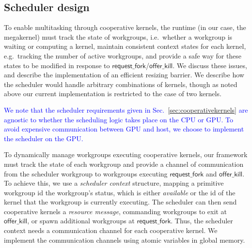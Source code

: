 \documentclass[sigconf]{acmart}
\newcommand{\TSAdded}[1]{\textcolor{blue}{#1}}
\newcommand{\mysec}{Sec.~}
\newcommand{\offerfork}{\mathsf{request\_fork}}
\newcommand{\offerkill}{\mathsf{offer\_kill}}
\newcommand{\getgroupid}{\mathsf{get\_group\_id}}
\newcommand{\getnumgroups}{\mathsf{get\_num\_groups}}
\begin{document}
{\subsection{Scheduler design}\label{sec:resizingbarrier}\label{sec:schedulerimpl}

To enable multitasking through cooperative kernels, the runtime (in
our case, the megakernel) must track the state of workgroups,
i.e.\ whether a workgroup is waiting or computing a kernel, maintain
consistent context states for each kernel, e.g.\ tracking the number
of active workgroups, and provide a safe way for these states to be
modified in response to $\offerfork$/$\offerkill$. We discuss these
issues, and describe the implementation of an efficient resizing
barrier. We describe how the scheduler would handle arbitrary
combinations of kernels, though as noted above our current
implementation is restricted to the case of two kernels.

\TSAdded{We note that the scheduler requirements given in
  \mysec{\ref{sec:cooperativekernels}} are agnostic to whether the
  scheduling logic takes place on the CPU or GPU. To
  avoid expensive communication between GPU and host, we choose to
  implement the scheduler on the GPU.}

%
%
To dynamically manage workgroups executing cooperative kernels, our
framework must track the state of each workgroup and provide a channel
of communication from the scheduler workgroup to workgroups executing
$\offerfork$ and $\offerkill$. To achieve this, we use a
\emph{scheduler context} structure, mapping a primitive workgroup id
the workgroup's status, which is either \emph{available} or the id of
the kernel that the workgroup is currently executing.  The scheduler
can then send cooperative kernels a \emph{resource message},
commanding workgroups to exit at $\offerkill$, or spawn additional
workgroups at $\offerfork$. Thus, the scheduler context needs a
communication channel for each cooperative kernel. We implement the
communication channels using atomic variables in global memory.

}
\end{document}
